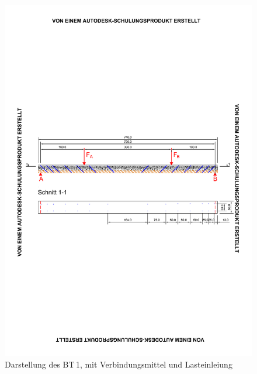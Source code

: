\documentclass[12 pt,a4 paper ]{scrreprt}
\begin{document}
\begin{figure}[h!]
\begin{center}
\includegraphics[scale =0.9,trim= 1.5cm 10cm 1.5cm 10cm, clip=true]{Auswertung/1versuch/BT1.pdf}
\caption{Darstellung des BT\,1, mit Verbindungsmittel und Lasteinleiung}
\label{1versuch}
\end{center}
\end{figure}
\end{document}
